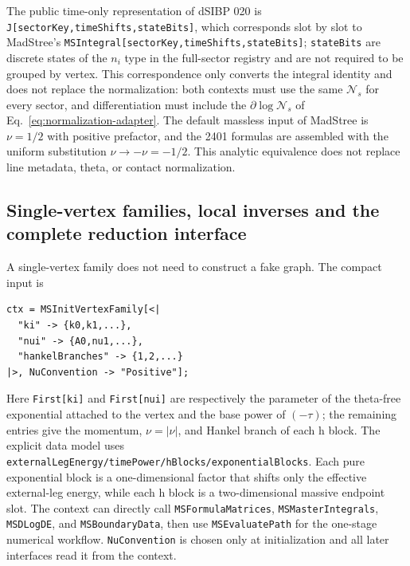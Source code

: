 \documentclass[11pt,a4paper]{article}
\newcommand{\cN}{\mathcal N}
\begin{document}
The public time-only representation of dSIBP 020 is \texttt{J[sectorKey,timeShifts,stateBits]}, which corresponds slot by slot to MadStree's \texttt{MSIntegral[sectorKey,timeShifts,stateBits]}; \texttt{stateBits} are discrete states of the $n_i$ type in the full-sector registry and are not required to be grouped by vertex. This correspondence only converts the integral identity and does not replace the normalization: both contexts must use the same $\cN_s$ for every sector, and differentiation must include the $\partial\log\cN_s$ of Eq.~\eqref{eq:normalization-adapter}. The default massless input of MadStree is $\nu=1/2$ with positive prefactor, and the 2401 formulas are assembled with the uniform substitution $\nu\to-\nu=-1/2$. This analytic equivalence does not replace line metadata, theta, or contact normalization.

\subsection{Single-vertex families, local inverses and the complete reduction interface}

A single-vertex family does not need to construct a fake graph. The compact input is
\begin{verbatim}
ctx = MSInitVertexFamily[<|
  "ki" -> {k0,k1,...},
  "nui" -> {A0,nu1,...},
  "hankelBranches" -> {1,2,...}
|>, NuConvention -> "Positive"];
\end{verbatim}
Here \texttt{First[ki]} and \texttt{First[nui]} are respectively the parameter of the
theta-free exponential attached to the vertex and the base power of $(-\tau)$; the remaining entries give the momentum,
$\nu=|\nu|$, and Hankel branch of each h block. The explicit data model uses
\texttt{externalLegEnergy/timePower/hBlocks/exponentialBlocks}. Each pure exponential block is a
one-dimensional factor that shifts only the effective external-leg energy, while each h block is a
two-dimensional massive endpoint slot. The context can directly call
\texttt{MSFormulaMatrices}, \texttt{MSMasterIntegrals}, \texttt{MSDLogDE}, and
\texttt{MSBoundaryData}, then use \texttt{MSEvaluatePath} for the one-stage numerical workflow.
\texttt{NuConvention} is chosen only at initialization and all later interfaces read it
from the context.
\end{document}
